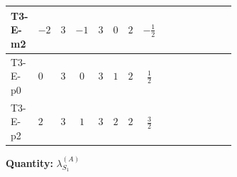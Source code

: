 \documentclass[8pt]{article}
\begin{document}
\begin{landscape}
\begin{longtable}{@{}llcccccc >{\raggedright\arraybackslash}p{0.21\linewidth} >{\raggedright\arraybackslash}p{0.21\linewidth} >{\raggedright\arraybackslash}p{0.21\linewidth}@{}}
\midrule
T3-E-m2 & $-2$ & $3$ & $-1$ & $3$ & $0$ & $2$ & $-\frac{1}{2}$ & \scriptsize\adjustbox{max width=\linewidth}{$\begin{gathered} +3 {\lambda_{HS_1}^{(A)}}^2\end{gathered}$} & \scriptsize\adjustbox{max width=\linewidth}{$\begin{gathered} +\frac{7 {\lambda_{S_1}^{(1)}}^2}{4}\end{gathered}$} & \scriptsize\adjustbox{max width=\linewidth}{$\begin{gathered} +22 {\lambda_{S_1}^{(A)}}^2\end{gathered}$} \\
\midrule
T3-E-p0 & $0$ & $3$ & $0$ & $3$ & $1$ & $2$ & $\frac{1}{2}$ & \scriptsize\adjustbox{max width=\linewidth}{$\begin{gathered} +3 {\lambda_{HS_1}^{(A)}}^2\end{gathered}$} & \scriptsize\adjustbox{max width=\linewidth}{$\begin{gathered} +\frac{7 {\lambda_{S_1}^{(1)}}^2}{4}\end{gathered}$} & \scriptsize\adjustbox{max width=\linewidth}{$\begin{gathered} +22 {\lambda_{S_1}^{(A)}}^2\end{gathered}$} \\
\midrule
T3-E-p2 & $2$ & $3$ & $1$ & $3$ & $2$ & $2$ & $\frac{3}{2}$ & \scriptsize\adjustbox{max width=\linewidth}{$\begin{gathered} +3 {\lambda_{HS_1}^{(A)}}^2\end{gathered}$} & \scriptsize\adjustbox{max width=\linewidth}{$\begin{gathered} +\frac{7 {\lambda_{S_1}^{(1)}}^2}{4}\end{gathered}$} & \scriptsize\adjustbox{max width=\linewidth}{$\begin{gathered} +22 {\lambda_{S_1}^{(A)}}^2\end{gathered}$} \\
\midrule
\bottomrule
\end{longtable}
\clearpage
\noindent\textbf{Quantity: }$\lambda_{S_1}^{(A)}$\par\smallskip

\end{landscape}
\end{document}
